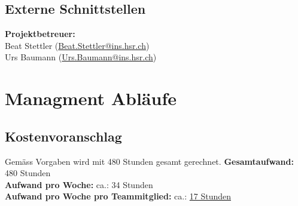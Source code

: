 \documentclass[11pt]{scrartcl}
\begin{document}

\subsection{Externe Schnittstellen}
\textbf{Projektbetreuer:} \\
Beat Stettler (\href{mailto:Beat.Stettler@ins.hsr.ch}{Beat.Stettler@ins.hsr.ch})  
\\
Urs Baumann (\href{mailto:Urs.Baumann@ins.hsr.ch}{Urs.Baumann@ins.hsr.ch})


\section{Managment Abläufe}

\subsection{Kostenvoranschlag}
Gemäss Vorgaben wird mit 480 Stunden gesamt gerechnet.
\newline
\textbf{Gesamtaufwand:} 480 Stunden\\
\textbf{Aufwand pro Woche:} ca.:  34 Stunden\\
\textbf{Aufwand pro Woche pro Teammitglied:} ca.: \uline{17 Stunden}
\end{document}
